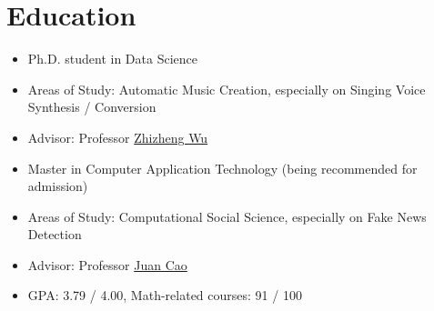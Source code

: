 \documentclass{resume}
\begin{document}





\section{Education}
{
  \small 
\begin{itemize}
  \item Ph.D. student in Data Science
  \item Areas of Study: Automatic Music Creation, especially on Singing Voice Synthesis / Conversion
  \item Advisor: Professor \href{https://scholar.google.com/citations?user=K6zhweAAAAAJ&hl=en}{Zhizheng Wu} 
\end{itemize}
}

{
  \small 
\begin{itemize}
  \item Master in Computer Application Technology (being recommended for admission)
  \item Areas of Study: Computational Social Science, especially on Fake News Detection
  \item Advisor: Professor \href{https://scholar.google.com/citations?user=fSBdNg0AAAAJ&hl=zh-CN}{Juan Cao}
  \item GPA: 3.79 / 4.00, Math-related courses: 91 / 100
\end{itemize}
}
\end{document}
